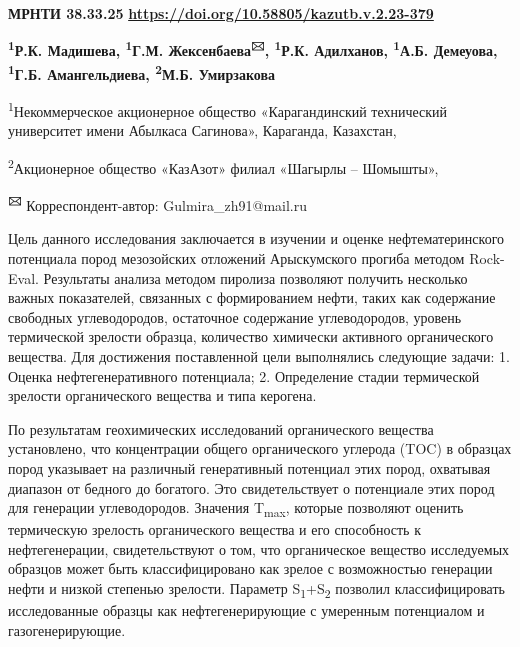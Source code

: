 \newpage
{\bfseries МРНТИ 38.33.25}
\hfill {\bfseries \href{https://doi.org/10.58805/kazutb.v.2.23-379}{https://doi.org/10.58805/kazutb.v.2.23-379}}


\begin{center}
{\bfseries \textsuperscript{1}Р.К. Мадишева, \textsuperscript{1}Г.М. Жексенбаева\textsuperscript{🖂}, \textsuperscript{1}Р.К. Адилханов, \textsuperscript{1}А.Б. Демеуова, \textsuperscript{1}Г.Б. Амангельдиева, \textsuperscript{2}М.Б. Умирзакова}

\textsuperscript{1}Некоммерческое акционерное общество «Карагандинский
технический университет имени Абылкаса Сагинова», Караганда, Казахстан,

\textsuperscript{2}Акционерное общество «КазАзот» филиал «Шагырлы --
Шомышты»,

{\bfseries \textsuperscript{🖂}} Корреспондент-автор: Gulmira\_zh91@mail.ru
\end{center}

Цель данного исследования заключается в изучении и оценке
нефтематеринского потенциала пород мезозойских отложений Арыскумского
прогиба методом Rock-Eval. Результаты анализа методом пиролиза позволяют
получить несколько важных показателей, связанных с формированием нефти,
таких как содержание свободных углеводородов, остаточное содержание
углеводородов, уровень термической зрелости образца, количество
химически активного органического вещества. Для достижения поставленной
цели выполнялись следующие задачи: 1. Оценка нефтегенеративного
потенциала; 2. Определение стадии термической зрелости органического
вещества и типа керогена.

По результатам геохимических исследований органического вещества
установлено, что концентрации общего органического углерода (TOC) в
образцах пород указывает на различный генеративный потенциал этих пород,
охватывая диапазон от бедного до богатого. Это свидетельствует о
потенциале этих пород для генерации углеводородов. Значения
T\textsubscript{max}, которые позволяют оценить термическую зрелость
органического вещества и его способность к нефтегенерации,
свидетельствуют о том, что органическое вещество исследуемых образцов
может быть классифицировано как зрелое с возможностью генерации нефти и
низкой степенью зрелости. Параметр S\textsubscript{1}+S\textsubscript{2}
позволил классифицировать исследованные образцы как нефтегенерирующие с
умеренным потенциалом и газогенерирующие.

